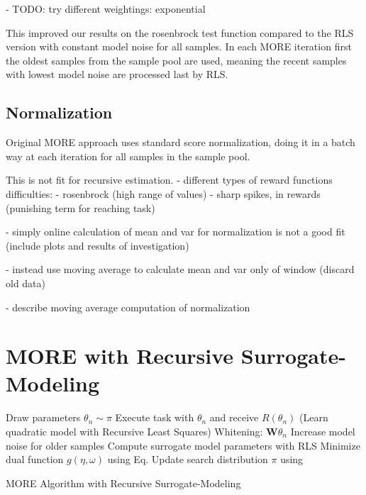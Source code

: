 - TODO: try different weightings: exponential

This improved our results on the rosenbrock test function compared
to the RLS version with constant model noise for all samples.
In each MORE iteration first the oldest samples from the sample pool
are used, meaning the recent samples with lowest model noise are
processed last by RLS.
\subsection{Normalization}
Original MORE approach uses standard score normalization, doing it
in a batch way at each iteration for all samples in the sample pool.

This is not fit for recursive estimation.
- different types of reward functions difficulties:
- rosenbrock (high range of values)
- sharp spikes, in rewards (punishing term for reaching task)

- simply online calculation of mean and var for normalization is not
a good fit (include plots and results of investigation)

- instead use moving average to calculate mean and var only of window (discard old
  data) 

- describe moving average computation of normalization

\section{MORE with Recursive Surrogate-Modeling}
\begin{algorithm}[H]
\DontPrintSemicolon
\SetAlgoLined
{}

{
  {
    Draw parameters $\theta_n \sim \pi$\;
    Execute task with $\theta_n$ and receive $R(\theta_n)$\;
  }
  \Begin(Learn quadratic model with Recursive Least Squares)
  {
    {
      Whitening: $\mathbf{W}\theta_n$\;
      Increase model noise for older samples\;
      Compute surrogate model parameters with RLS\;
    }
  }
  Minimize dual function $g(\eta, \omega)$ using Eq.\;
  Update search distribution $\pi$ using  \;
}
\caption{MORE Algorithm with Recursive Surrogate-Modeling}
\end{algorithm}

